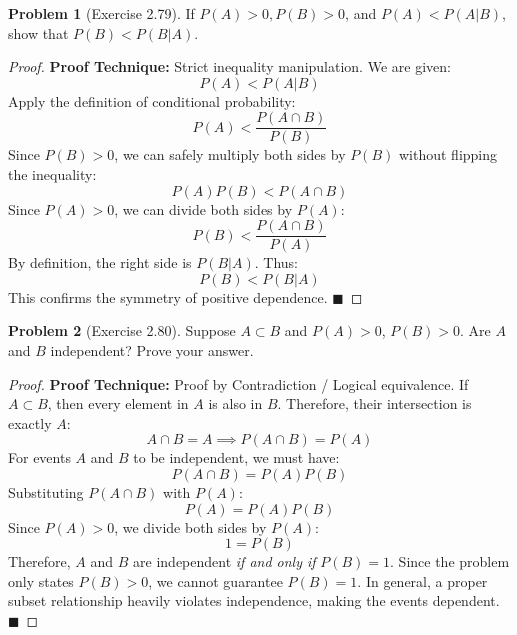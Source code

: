 \documentclass[11pt, letterpaper]{article}
\theoremstyle{definition}
\newtheorem{problem}{Problem}
\begin{document}
\vspace{0.5cm}

\begin{problem}[Exercise 2.79]
If $P(A) > 0, P(B) > 0$, and $P(A) < P(A|B)$, show that $P(B) < P(B|A)$.
\end{problem}
\begin{proof}
\textbf{Proof Technique:} Strict inequality manipulation.
We are given:
\[ P(A) < P(A|B) \]
Apply the definition of conditional probability:
\[ P(A) < \frac{P(A \cap B)}{P(B)} \]
Since $P(B) > 0$, we can safely multiply both sides by $P(B)$ without flipping the inequality:
\[ P(A)P(B) < P(A \cap B) \]
Since $P(A) > 0$, we can divide both sides by $P(A)$:
\[ P(B) < \frac{P(A \cap B)}{P(A)} \]
By definition, the right side is $P(B|A)$. Thus:
\[ P(B) < P(B|A) \]
This confirms the symmetry of positive dependence. $\blacksquare$
\end{proof}

\vspace{0.5cm}

\begin{problem}[Exercise 2.80]
Suppose $A \subset B$ and $P(A) > 0$, $P(B) > 0$. Are $A$ and $B$ independent? Prove your answer.
\end{problem}
\begin{proof}
\textbf{Proof Technique:} Proof by Contradiction / Logical equivalence.
If $A \subset B$, then every element in $A$ is also in $B$. Therefore, their intersection is exactly $A$:
\[ A \cap B = A \implies P(A \cap B) = P(A) \]
For events $A$ and $B$ to be independent, we must have:
\[ P(A \cap B) = P(A)P(B) \]
Substituting $P(A \cap B)$ with $P(A)$:
\[ P(A) = P(A)P(B) \]
Since $P(A) > 0$, we divide both sides by $P(A)$:
\[ 1 = P(B) \]
Therefore, $A$ and $B$ are independent \textit{if and only if} $P(B) = 1$. Since the problem only states $P(B) > 0$, we cannot guarantee $P(B) = 1$. In general, a proper subset relationship heavily violates independence, making the events dependent. $\blacksquare$
\end{proof}

\vspace{0.5cm}
\end{document}

